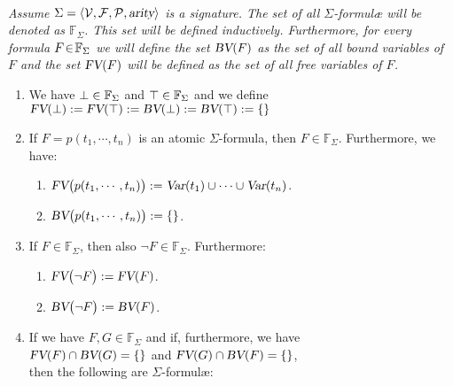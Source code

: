 \begin{Definition} \hspace*{\fill} \\
{\em \label{praedikaten-formel}
    Assume $\Sigma = \langle \mathcal{V}, \mathcal{F}, \mathcal{P}, \textsl{arity} \rangle$ is a signature.
    The set of all  $\Sigma$-\emph{formul\ae} will be denoted as  $\mathbb{F}_\Sigma$.
    This set will be defined inductively.
    Furthermore, for every formula  $F\!\in\! \mathbb{F}_\Sigma$ we will define the set $\textsl{BV}(F)$
    as the set of all \emph{bound variables} of $F$  and the set $\textsl{FV}(F)$ will be defined as
    the set of all \emph{free variables} of $F$.
    \begin{enumerate}
    \item We have $\bot \in \mathbb{F}_\Sigma$ and $\top \in \mathbb{F}_\Sigma$ and we define \\[0.2cm]
          \hspace*{1.3cm} $\textsl{FV}(\bot) := \textsl{FV}(\top) := \textsl{BV}(\bot) := \textsl{BV}(\top) := \{\}$
    \item If  $F = p(t_1,\cdots,t_n)$ is an atomic $\Sigma$-formula, then $F \in \mathbb{F}_\Sigma$.
          Furthermore, we have:
          \begin{enumerate}
          \item $\textsl{FV}\bigl(p(t_1,\cdots,t_n) \bigr) := \textsl{Var}(t_1) \cup \cdots \cup \textsl{Var}(t_n)$.
          \item $\textsl{BV}\bigl(p(t_1,\cdots,t_n) \bigr) := \{\}$.
          \end{enumerate}
    \item If $F \in \mathbb{F}_\Sigma$, then also $\neg F \in \mathbb{F}_\Sigma$. Furthermore:
          \begin{enumerate}
          \item $\textsl{FV}\bigl( \neg F \bigr) := \textsl{FV}(F)$.
          \item $\textsl{BV}\bigl( \neg F \bigr) := \textsl{BV}(F)$.
          \end{enumerate}
    \item If we have $F, G \in \mathbb{F}_\Sigma$ and if, furthermore, we have \\[0.2cm]
          \hspace*{1.3cm} $\textsl{FV}(F) \cap \textsl{BV}(G) = \{\}$ \quad and \quad
                          $\textsl{FV}(G) \cap \textsl{BV}(F) = \{\}$, \\[0.2cm]
          then the following are $\Sigma$-formul\ae:
          \begin{enumerate}

\end{enumerate}
\end{enumerate}}
\end{Definition}
